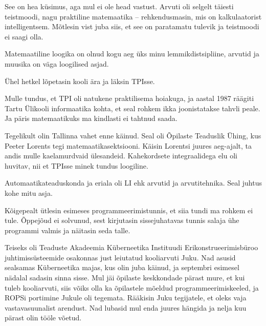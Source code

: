 See on hea küsimus, aga mul ei ole head vastust. Arvuti oli selgelt täiesti 
teistmoodi, nagu praktiline matemaatika -- rehkendusmasin, mis on kalkulaatorist intelligentsem. Mõtlesin vist
juba siis, et see on paratamatu tulevik ja teistmoodi ei saagi olla. 


Matemaatiline loogika on olnud kogu aeg üks minu lemmikdistsipliine, arvutid 
ja muusika on väga loogilised asjad. 

Ühel hetkel lõpetasin kooli ära ja läksin TPIsse.


Mulle tundus, et TPI oli natukene praktilisema hoiakuga, ja aastal 
1987 räägiti Tartu Ülikooli informaatika kohta, 
et seal rohkem ikka joonistatakse tahvli peale. Ja päris matemaatikuks ma kindlasti 
ei tahtnud saada.

Tegelikult olin Tallinna vahet enne käinud. Seal oli Õpilaste 
Teaduslik Ühing, kus Peeter 
Lorents tegi matemaatikasektsiooni. Käisin 
Lorentsi juures aeg-ajalt, ta andis mulle kaelamurdvaid 
ülesandeid. Kahekordsete integraalidega 
elu oli huvitav, nii et TPIsse minek tundus loogiline.


Automaatikateaduskonda ja eriala oli
LI ehk arvutid ja 
arvutitehnika. Seal juhtus kohe mitu asja. 

Kõigepealt ütlesin esimeses programmeerimistunnis, et siia tundi ma rohkem 
ei tule. Õppejõud ei solvunud, sest kirjutasin sissejuhatavas tunnis salaja
ühe programmi valmis ja näitasin seda talle.

Teiseks oli Teaduste Akadeemia Küberneetika Instituudi 
Erikonstrueerimisbüroo juhtimissüsteemide osakonnas just
leiutatud kooliarvuti Juku. Nad asusid sealsamas Küberneetika majas, kus olin juba käinud, ja 
septembri esimesel nädalal sadasin sinna sisse. Mul jäi 
õpilaste keskkondade pärast mure, et kui tuleb kooliarvuti, siis võiks olla ka 
õpilastele mõeldud programmeerimiskeeled, ja ROPSi portimine 
Jukule oli tegemata. Rääkisin Juku tegijatele, et oleks vaja vastavasuunalist 
arendust. Nad lubasid mul enda juures hängida ja nelja kuu pärast 
olin tööle võetud. 

